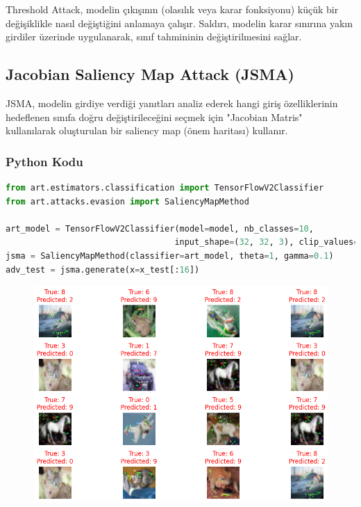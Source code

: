 Threshold Attack, modelin çıkışının (olasılık veya karar fonksiyonu) küçük bir değişiklikle nasıl değiştiğini anlamaya çalışır. Saldırı, modelin karar sınırına yakın girdiler üzerinde uygulanarak, sınıf tahmininin değiştirilmesini sağlar.

\newpage

\subsection{Jacobian Saliency Map Attack (JSMA)} 

JSMA, modelin girdiye verdiği yanıtları analiz ederek hangi giriş özelliklerinin hedeflenen sınıfa doğru değiştirileceğini seçmek için "Jacobian Matris" kullanılarak oluşturulan bir saliency map (önem haritası) kullanır. 

\subsubsection{Python Kodu}

\begin{lstlisting}[language=Python]
from art.estimators.classification import TensorFlowV2Classifier
from art.attacks.evasion import SaliencyMapMethod

art_model = TensorFlowV2Classifier(model=model, nb_classes=10, 
                                  input_shape=(32, 32, 3), clip_values=(0, 1))
jsma = SaliencyMapMethod(classifier=art_model, theta=1, gamma=0.1)
adv_test = jsma.generate(x=x_test[:16])
\end{lstlisting}

\begin{figure}[h]
    \centering
    \includegraphics[width=1\textwidth]{images/jsma_results.png}
    \caption{}
\end{figure}

